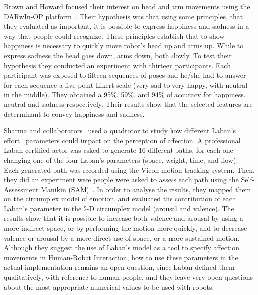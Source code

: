 Brown and Howard focused their interest on head and arm movements using the DARwIn-OP platform~\cite{Brown2014}. Their hypothesis was that using some principles, that they evaluated as important, it is possible to express happiness and sadness in a way that people could recognize. These principles establish that to show happiness is necessary to quickly move robot's head up and arms up. While to express sadness the head goes down, arms down, both slowly. To test their hypothesis they conducted an experiment with thirteen participants. Each participant was exposed to fifteen sequences of poses and he/she had to answer for each sequence a five-point Likert scale (very-sad to very happy, with neutral in the middle). They obtained a 95\%, 59\%, and 94\% of accuracy for happiness, neutral and sadness respectively. Their results show that the selected features are determinant to convey happiness and sadness.
 
Sharma and collaborators~\cite{Sharma2013} used a quadrotor to study how different Laban's effort~\cite{Laban1968} parameters could impact on the perception of affection. A professional Laban certified actor was asked to generate 16 different paths, for each one changing one of the four Laban's parameters (space, weight, time, and flow). Each generated path was recorded using the Vicon motion-tracking system. Then, they did an experiment were people were asked to assess each path using the Self-Assessment Manikin (SAM)~\cite{Lang2008}. In order to analyse the results, they mapped them on the circumplex model of emotion, and evaluated the contribution of each Laban's parameter in the 2-D circumplex model (arousal and valence). The results show that it is possible to increase both valence and arousal by using a more indirect space, or by performing the motion more quickly, and to decrease valence or arousal by a more direct use of space, or a more sustained motion. 
Although they suggest the use of Laban's model as a tool to specify affection movements in Human-Robot Interaction, how to use these parameters in the actual implementation remains an open question, since Laban defined them qualitatively, with reference to human people, and they leave very open questions about the most appropriate numerical values to be used with robots.

